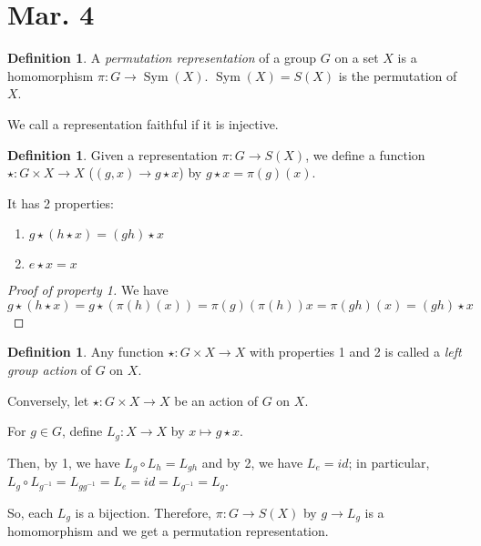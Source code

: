 \documentclass{amsart}
\theoremstyle{definition}
\newtheorem{definition}[thm]{Definition}
\DeclareMathOperator{\Sym}{Sym}
\begin{document}
\section{Mar. 4}
\begin{definition}
	A \emph{permutation representation} of a group $G$ on a set $X$ is a homomorphism $\pi:G\to \Sym(X)$. $\Sym(X)=S(X)$ is the permutation of $X$. 
	
	We call a representation faithful if it is injective.
\end{definition}
\begin{definition}
	Given a representation $\pi:G\to S(X)$, we define a function $\star:G\times X\to X$ ($(g,x)\to g\star x$) by $g\star x=\pi(g)(x)$.
	
	It has 2 properties:
	\begin{enumerate}
		\item $g\star(h\star x)=(gh)\star x$	
		\item $e\star x=x$
	\end{enumerate}
\end{definition}
\begin{proof}[Proof of property 1]
	We have $$g\star(h\star x)=g\star(\pi(h)(x))=\pi(g)(\pi(h))x=\pi(gh)(x)=(gh)\star x$$
\end{proof}
\begin{definition}
	Any function $\star:G\times X\to X$ with properties 1 and 2 is called a \emph{left group action} of $G$ on $X$.
\end{definition}

Conversely, let $\star:G\times X\to X$ be an action of $G$ on $X$.

For $g\in G$, define $L_g:X\to X$ by $x\mapsto g\star x$.

Then, by 1, we have $L_g\circ L_h=L_{gh}$ and by 2, we have $L_e=id$; in particular, $L_g\circ L_{g^{-1}}=L_{gg^{-1}}=L_e=id=L_{g^{-1}}=L_g$.

So, each $L_g$ is a bijection. Therefore, $\pi:G\to S(X)$ by $g\to L_g$ is a homomorphism and we get a permutation representation.
\end{document}
